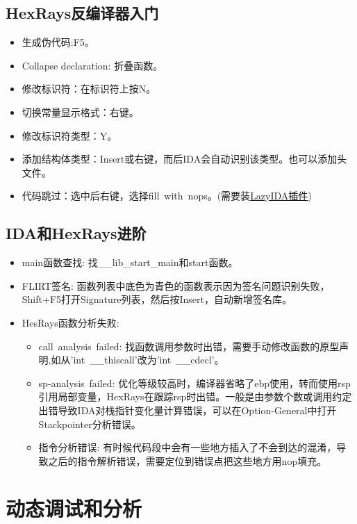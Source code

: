 \subsection{HexRays反编译器入门}
\begin{itemize}
    \item 生成伪代码:F5。
    \item Collapse declaration: 折叠函数。
    \item 修改标识符：在标识符上按N。
    \item 切换常量显示格式：右键。
    \item 修改标识符类型：Y。
    \item 添加结构体类型：Insert或右键，而后IDA会自动识别该类型。也可以添加头文件。
    \item 代码跳过：选中后右键，选择fill\ with\ nops。(需要装\href{https://github.com/L4ys/LazyIDA}{LazyIDA插件})
\end{itemize}

\subsection{IDA和HexRays进阶}
\begin{itemize}
    \item main函数查找: 找\_\_lib\_start\_main和start函数。
    \item FLIRT签名: 函数列表中底色为青色的函数表示因为签名问题识别失败，Shift+F5打开Signature列表，然后按Insert，自动新增签名库。
    \item HesRays函数分析失败:
    \begin{itemize}
        \item call\ analysis\ failed: 找函数调用参数时出错，需要手动修改函数的原型声明,如从'int\ \_\_thiscall'改为'int\ \_\_cdecl'。
        \item sp-analysis\ failed: 优化等级较高时，编译器省略了ebp使用，转而使用rsp引用局部变量，HexRays在跟踪rsp时出错。一般是由参数个数或调用约定出错导致IDA对栈指针变化量计算错误，可以在Option-General中打开Stackpointer分析错误。
        \item 指令分析错误: 有时候代码段中会有一些地方插入了不会到达的混淆，导致之后的指令解析错误，需要定位到错误点把这些地方用nop填充。
    \end{itemize}  
\end{itemize}

\section{动态调试和分析}
